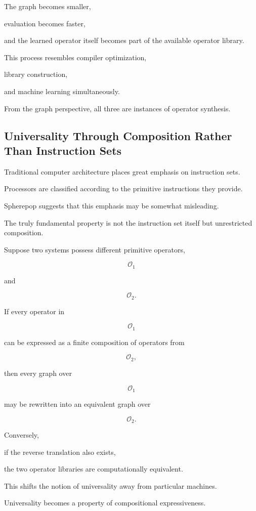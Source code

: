 \documentclass[12pt,oneside]{article}
\begin{document}
The graph becomes smaller,

evaluation becomes faster,

and the learned operator itself becomes part of the available operator library.

This process resembles compiler optimization,

library construction,

and machine learning simultaneously.

From the graph perspective, all three are instances of operator synthesis.

\subsection{Universality Through Composition Rather Than Instruction Sets}

Traditional computer architecture places great emphasis on instruction sets.

Processors are classified according to the primitive instructions they provide.

Spherepop suggests that this emphasis may be somewhat misleading.

The truly fundamental property is not the instruction set itself but unrestricted composition.

Suppose two systems possess different primitive operators,

\[
\mathcal O_1
\]

and

\[
\mathcal O_2.
\]

If every operator in

\[
\mathcal O_1
\]

can be expressed as a finite composition of operators from

\[
\mathcal O_2,
\]

then every graph over

\[
\mathcal O_1
\]

may be rewritten into an equivalent graph over

\[
\mathcal O_2.
\]

Conversely,

if the reverse translation also exists,

the two operator libraries are computationally equivalent.

This shifts the notion of universality away from particular machines.

Universality becomes a property of compositional expressiveness.
\end{document}
